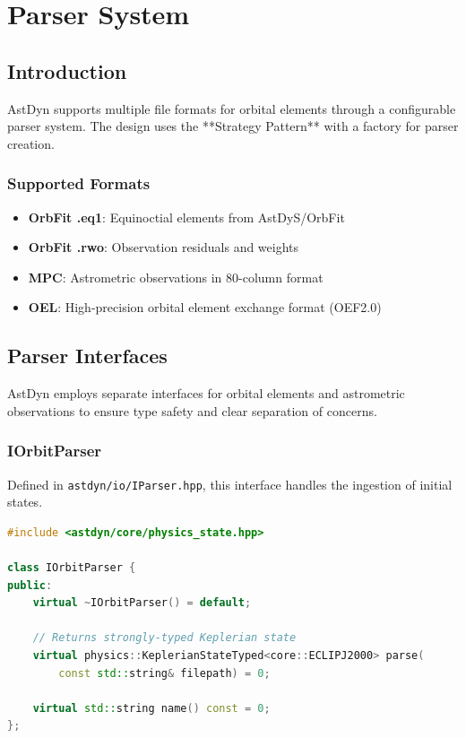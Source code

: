 \chapter{Parser System}
\label{ch:parsers}

\section{Introduction}

AstDyn supports multiple file formats for orbital elements through a configurable parser system. The design uses the **Strategy Pattern** with a factory for parser creation.

\subsection{Supported Formats}

\begin{itemize}
    \item \textbf{OrbFit .eq1}: Equinoctial elements from AstDyS/OrbFit
    \item \textbf{OrbFit .rwo}: Observation residuals and weights
    \item \textbf{MPC}: Astrometric observations in 80-column format
    \item \textbf{OEL}: High-precision orbital element exchange format (OEF2.0)
\end{itemize}
\section{Parser Interfaces}

AstDyn employs separate interfaces for orbital elements and astrometric observations to ensure type safety and clear separation of concerns.

\subsection{IOrbitParser}

Defined in \texttt{astdyn/io/IParser.hpp}, this interface handles the ingestion of initial states.

\begin{lstlisting}[language=C++,caption={IOrbitParser interface}]
#include <astdyn/core/physics_state.hpp>

class IOrbitParser {
public:
    virtual ~IOrbitParser() = default;
    
    // Returns strongly-typed Keplerian state
    virtual physics::KeplerianStateTyped<core::ECLIPJ2000> parse(
        const std::string& filepath) = 0;
        
    virtual std::string name() const = 0;
};
\end{lstlisting}

